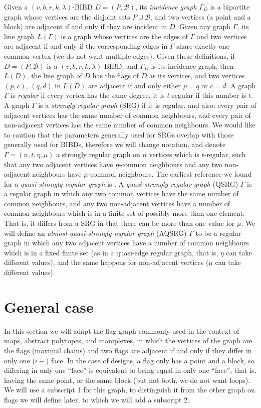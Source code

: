 \documentclass[letterpaper,10pt]{article}
\theoremstyle{plain}
\theoremstyle{definition}
\begin{document}
Given a $(v,b,r,k,\lambda)$-BIBD $D=(P,\mathcal{B})$, its {\em{incidence graph}} $\Gamma_D$ is a bipartite graph whose vertices are the disjoint sets $P\cup\mathcal{B}$, and two vertices (a point and a block) are adjacent if and only if they are incident in $D$. Given any graph $\Gamma$, its {line graph} $L(\Gamma)$ is a graph whose vertices are the edges of $\Gamma$ and two vertices are adjacent if and only if the corresponding edges in $\Gamma$ share exactly one common vertex (we do not want multiple edges). Given these definitions, if $D=(P,\mathcal{B})$ is a $(v,b,r,k,\lambda)$-BIBD, and $\Gamma_D$ is its incidence graph, then $L(D)$, the line graph of $D$ has the flags of $D$ as its vertices, and two vertices $(p,c)$, $(q,d)$ in $L(D)$ are adjacent if and only either $p=q$ or $c=d$. A graph $\Gamma$ is {\em{regular}} if every vertex has the same degree, it is $t$-regular if this number is $t$. A graph $\Gamma$ is a {\em{strongly regular graph}} (SRG) if it is regular, and also: every pair of adjacent vertices has the same number of common neighbours, and every pair of non-adjacent vertices has the same number of common neighbours. We would like to caution that the parameters generally used for SRGs overlap with those generally used for BIBDs, therefore we will change notation, and denote $\Gamma=(n,t,\eta,\mu)$ a strongly regular graph on $n$ vertices which is $t$-regular, such that any two adjacent vertices have $\eta$-common neighbours and any two non-adjacent neighbours have $\mu$-common neighbours. The earliest reference we found for a {\em{quasi-strongly regular graph}} is \cite{An}. A {\em{quasi-strongly regular graph}} (QSRG) $\Gamma$ is a regular graph in which any two common vertices have the same number of common neighbours, and any two non-adjacent vertices have a number of common neighbours which is in a finite set of possibly more than one element. That is, it differs from a SRG in that there can be more than one value for $\mu$. We will define an {\em{almost-quasi-strongly regular graph}} (AQSRG) $\Gamma$ to be a regular graph in which any two adjacent vertices have a number of common neighbours which is in a fixed finite set (as in a quasi-edge regular graph, that is, $\eta$ can take different values), and the same happens for non-adjacent vertices ($\mu$ can take different values).\\



\section{General case}\label{gc}
In this section we will adapt the flag-graph commonly used in the context of maps, abstract polytopes, and maniplexes, in which the vertices of the graph are the flags (maximal chains) and two flags are adjacent if and only if they differ in only one ($i-$) face. In the case of designs, a flag only has a point and a block, so differing in only one ``face'' is equivalent to being equal in only one ``face'', that is, having the same point, or the same block (but not both, we do not want loops). We will use a subscript 1 for this graph, to distinguish it from the other graph on flags we will define later, to which we will add a subscript 2.
\end{document}
